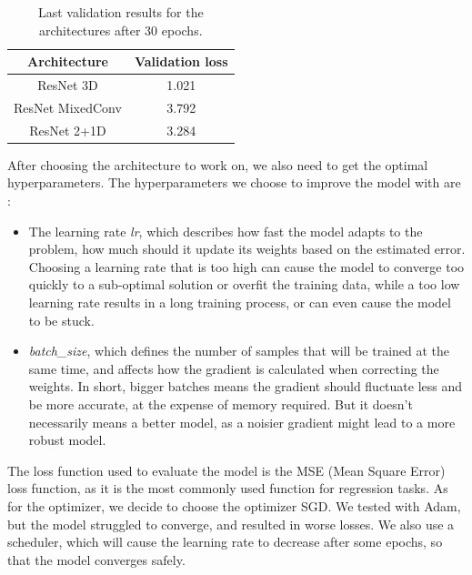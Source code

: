 \documentclass[10pt,conference]{IEEEtran}
\begin{document}
\begin{table}[h!]
\centering
 \begin{tabular}{|c | c |} 
 \hline
    Architecture & Validation loss \\  
 \hline\hline
    ResNet 3D & 1.021\\ 
 \hline
    ResNet MixedConv & 3.792\\
 \hline
    ResNet 2+1D & 3.284\\
 \hline
\end{tabular}
\caption{Last validation results for the architectures after 30 epochs.}
\label{table:comparisonLoss}
\end{table}

After choosing the architecture to work on, we also need to get the optimal hyperparameters. The hyperparameters we choose to improve the model with are :
\begin{itemize}
  \item The learning rate \textit{lr}, which describes how fast the model adapts to the problem, how much should it update its weights based on the estimated error. Choosing a learning rate that is too high can cause the model to converge too quickly to a sub-optimal solution or overfit the training data, while a too low learning rate results in a long training process, or can even cause the model to be stuck.
  \item \textit{batch\_size}, which defines the number of samples that will be trained at the same time, and affects how the gradient is calculated when correcting the weights. In short, bigger batches means the gradient should fluctuate less and be more accurate, at the expense of memory required. But it doesn't necessarily means a better model, as a noisier gradient might lead to a more robust model.
\end{itemize}
 
The loss function used to evaluate the model is the MSE (Mean Square Error) loss function, as it is the most commonly used function for regression tasks. As for the optimizer, we decide to choose the optimizer SGD. We tested with Adam, but the model struggled to converge, and resulted in worse losses. We also use a scheduler, which will cause the learning rate to decrease after some epochs, so that the model converges safely.
\end{document}
